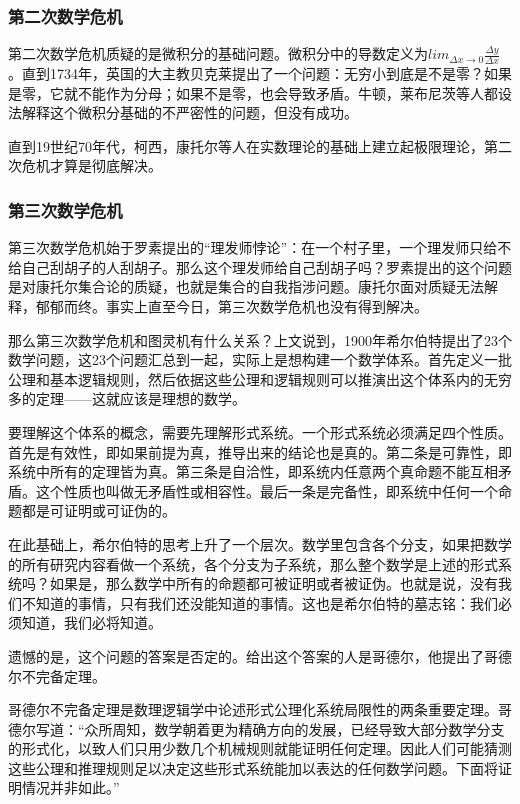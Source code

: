 \documentclass{ctexart}
\begin{document}
	\subsubsection{第二次数学危机}
	第二次数学危机质疑的是微积分的基础问题。微积分中的导数定义为$ lim_{\Delta x \to 0}\frac{\Delta y}{\Delta x} $。直到1734年，英国的大主教贝克莱提出了一个问题：无穷小到底是不是零？如果是零，它就不能作为分母；如果不是零，也会导致矛盾。牛顿，莱布尼茨等人都设法解释这个微积分基础的不严密性的问题，但没有成功。
	
	直到19世纪70年代，柯西，康托尔等人在实数理论的基础上建立起极限理论，第二次危机才算是彻底解决。
	\subsubsection{第三次数学危机}
	第三次数学危机始于罗素提出的“理发师悖论”：在一个村子里，一个理发师只给不给自己刮胡子的人刮胡子。那么这个理发师给自己刮胡子吗？罗素提出的这个问题是对康托尔集合论的质疑，也就是集合的自我指涉问题。康托尔面对质疑无法解释，郁郁而终。事实上直至今日，第三次数学危机也没有得到解决。
	
	那么第三次数学危机和图灵机有什么关系？上文说到，1900年希尔伯特提出了23个数学问题，这23个问题汇总到一起，实际上是想构建一个数学体系。首先定义一批公理和基本逻辑规则，然后依据这些公理和逻辑规则可以推演出这个体系内的无穷多的定理——这就应该是理想的数学。
	
	要理解这个体系的概念，需要先理解形式系统。一个形式系统必须满足四个性质。首先是有效性，即如果前提为真，推导出来的结论也是真的。第二条是可靠性，即系统中所有的定理皆为真。第三条是自洽性，即系统内任意两个真命题不能互相矛盾。这个性质也叫做无矛盾性或相容性。最后一条是完备性，即系统中任何一个命题都是可证明或可证伪的。
	
	在此基础上，希尔伯特的思考上升了一个层次。数学里包含各个分支，如果把数学的所有研究内容看做一个系统，各个分支为子系统，那么整个数学是上述的形式系统吗？如果是，那么数学中所有的命题都可被证明或者被证伪。也就是说，没有我们不知道的事情，只有我们还没能知道的事情。这也是希尔伯特的墓志铭：我们必须知道，我们必将知道。
	
	遗憾的是，这个问题的答案是否定的。给出这个答案的人是哥德尔，他提出了哥德尔不完备定理。
	
	哥德尔不完备定理是数理逻辑学中论述形式公理化系统局限性的两条重要定理。哥德尔写道：“众所周知，数学朝着更为精确方向的发展，已经导致大部分数学分支的形式化，以致人们只用少数几个机械规则就能证明任何定理。因此人们可能猜测这些公理和推理规则足以决定这些形式系统能加以表达的任何数学问题。下面将证明情况并非如此。”
	
\end{document}
